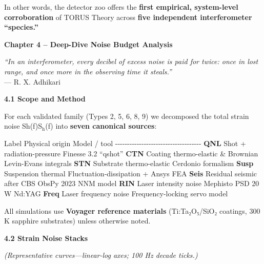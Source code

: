 \documentclass[]{article}
\newcommand{\subscript}[1]{\ensuremath{_{\mathrm{#1}}}}
\begin{document}
In other words, the detector zoo offers the \textbf{first empirical,
system-level corroboration} of TORUS Theory across \textbf{five
independent interferometer ``species.''}

\textbf{Chapter 4 -- Deep-Dive Noise Budget Analysis}

\emph{``In an interferometer, every decibel of excess noise is paid for
twice: once in lost range, and once more in the observing time it
steals.''}\\
--- R. X. Adhikari

\textbf{4.1 Scope and Method}

For each validated family (Types 2, 5, 6, 8, 9) we decomposed the total
strain noise Sh(f)S\subscript{h}(f) into \textbf{seven canonical
sources}:

\textbar{} Label \textbar{} Physical origin \textbar{} Model / tool
\textbar{}
\textbar{}-\/-\/-\/-\/-\/-\textbar{}-\/-\/-\/-\/-\/-\/-\/-\/-\/-\/-\/-\/-\/-\/-\/-\/-\textbar{}-\/-\/-\/-\/-\/-\/-\/-\/-\/-\/-\/-\/-\textbar{}
\textbar{} \textbf{QNL} \textbar{} Shot + radiation-pressure \textbar{}
Finesse 3.2 ``qshot'' \textbar{} \textbar{} \textbf{CTN} \textbar{}
Coating thermo-elastic \& Brownian \textbar{} Levin-Evans integrals
\textbar{} \textbar{} \textbf{STN} \textbar{} Substrate thermo-elastic
\textbar{} Cerdonio formalism \textbar{} \textbar{} \textbf{Susp}
\textbar{} Suspension thermal \textbar{} Fluctuation-dissipation + Ansys
FEA \textbar{} \textbar{} \textbf{Seis} \textbar{} Residual seismic
after CBS \textbar{} ObsPy 2023 NNM model \textbar{} \textbar{}
\textbf{RIN} \textbar{} Laser intensity noise \textbar{} Mephisto PSD 20
W Nd:YAG \textbar{} \textbar{} \textbf{Freq} \textbar{} Laser frequency
noise \textbar{} Frequency-locking servo model \textbar{}

All simulations use \textbf{Voyager reference materials} (Ti:Ta₂O₅/SiO₂
coatings, 300 K sapphire substrates) unless otherwise noted.

\textbf{4.2 Strain Noise Stacks}

\emph{(Representative curves---linear-log axes; 100 Hz decade ticks.)}
\end{document}
